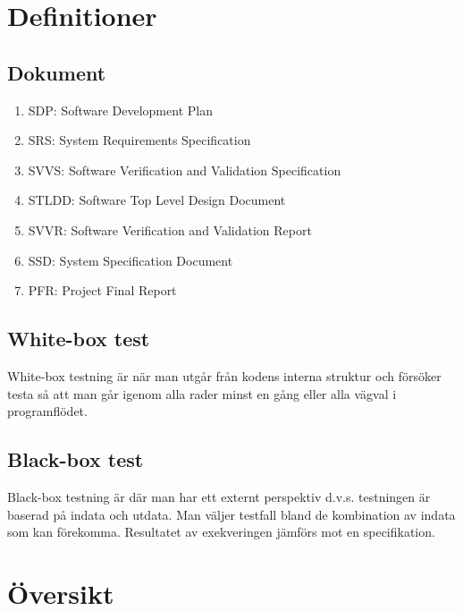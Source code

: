 \documentclass[a4paper]{article}
\begin{document}
\section{Definitioner}

\subsection{Dokument}

\begin{enumerate}

\item SDP: Software Development Plan

\item SRS: System Requirements Specification

\item SVVS: Software Verification and Validation Specification

\item STLDD: Software Top Level Design Document

\item SVVR: Software Verification and Validation Report

\item SSD: System Specification Document

\item PFR: Project Final Report


\end{enumerate}

\subsection{White-box test}

White-box testning är när man utgår från kodens interna struktur och försöker testa så att man går igenom alla rader minst en gång eller alla vägval i programflödet.

\subsection{Black-box test}

Black-box testning är där man har ett externt perspektiv d.v.s. testningen är baserad på indata och utdata. Man väljer testfall bland de kombination av indata som kan förekomma. Resultatet av exekveringen jämförs mot en specifikation.


\section{Översikt}
\end{document}
